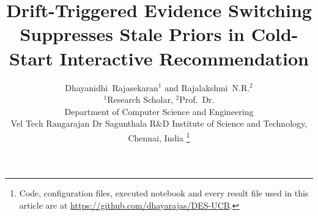 \documentclass[onecolumn,12pt,draftclsnofoot]{IEEEtran}
\begin{document}
\title{Drift-Triggered Evidence Switching Suppresses Stale Priors in Cold-Start Interactive Recommendation}
\author{Dhayanidhi~Rajasekaran$^{1}$ and Rajalakshmi~N.R.$^{2}$\\[2pt]
{\normalsize $^{1}$Research Scholar, $^{2}$Prof.\ Dr.}\\
{\normalsize Department of Computer Science and Engineering}\\
{\normalsize Vel Tech Rangarajan Dr Sagunthala R\&D Institute of Science and Technology, Chennai, India}%
\thanks{Code, configuration files, executed notebook and every result file used in this article are at \url{https://github.com/dhayarajas/DES-UCB}.}%
}
\maketitle

\end{document}
